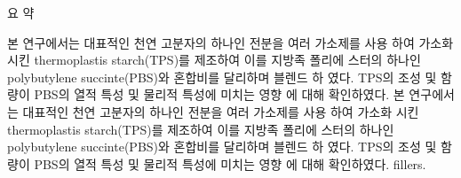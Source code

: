 \clearpage
\thispagestyle{empty}


\begin{center}
	
	
	{\fontsize{20pt}{24pt}\selectfont
		\ThesisTitleKr \par}
	
	\vspace{1.6cm}
	
	{\fontsize{14pt}{16pt}\selectfont
		\ThesisAuthorKr \par}
	
	\vspace{0.4cm}
	
	{\fontsize{14pt}{24pt}
		\selectfont
		\ThesisSchoolKr \par
		\ThesisUniversityKr \par
	}
	
	\vspace{1.0cm}
	
	{\fontsize{14pt}{16pt}\selectfont 요  \hspace{1cm} 약 \par}
	
\end{center}


\noindent
본 연구에서는 대표적인 천연 고분자의 하나인 전분을 여러 가소제를 사용
하여 가소화 시킨 thermoplastis starch(TPS)를 제조하여 이를 지방족 폴리에
스터의 하나인 polybutylene succinte(PBS)와 혼합비를 달리하며 블렌드 하
였다. TPS의 조성 및 함량이 PBS의 열적 특성 및 물리적 특성에 미치는 영향
에 대해 확인하였다. 
본 연구에서는 대표적인 천연 고분자의 하나인 전분을 여러 가소제를 사용
하여 가소화 시킨 thermoplastis starch(TPS)를 제조하여 이를 지방족 폴리에
스터의 하나인 polybutylene succinte(PBS)와 혼합비를 달리하며 블렌드 하
였다. TPS의 조성 및 함량이 PBS의 열적 특성 및 물리적 특성에 미치는 영향
에 대해 확인하였다. 
fillers.


